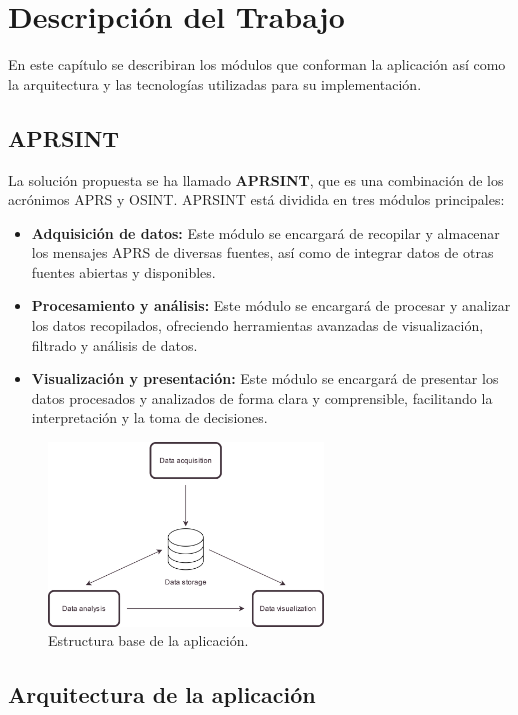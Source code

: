 \chapter{Descripción del Trabajo}
\label{cap:descripcionTrabajo}

En este capítulo se describiran los módulos que conforman la aplicación así como la arquitectura y las tecnologías utilizadas para su implementación.
\section{APRSINT}
La solución propuesta se ha llamado \textbf{APRSINT}, que es una combinación de los acrónimos APRS y OSINT. APRSINT está dividida en tres módulos principales:
\begin{itemize}
	\item \textbf{Adquisición de datos:} Este módulo se encargará de recopilar y almacenar los mensajes APRS de diversas fuentes, así como de integrar datos de otras fuentes abiertas y disponibles.
	\item \textbf{Procesamiento y análisis:} Este módulo se encargará de procesar y analizar los datos recopilados, ofreciendo herramientas avanzadas de visualización, filtrado y análisis de datos.
	\item \textbf{Visualización y presentación:} Este módulo se encargará de presentar los datos procesados y analizados de forma clara y comprensible, facilitando la interpretación y la toma de decisiones.
\end{itemize}

\begin{figure}[h]
    \centering
    \includegraphics[width=0.65\textwidth]{Imagenes/Chapter_3/structure.png}
    \caption{Estructura base de la aplicación.}
    \label{fig:aprsint-logo}
\end{figure}

\section{Arquitectura de la aplicación}

